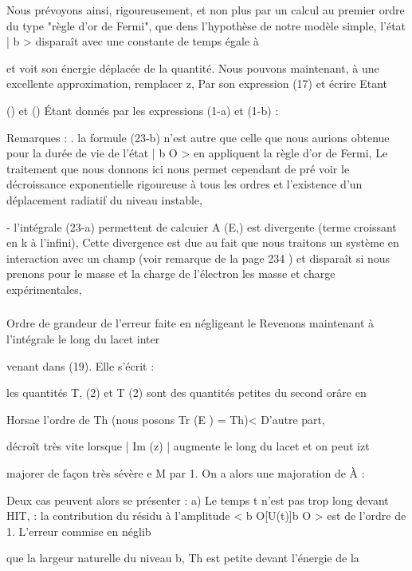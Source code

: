 Nous prévoyons ainsi, rigoureusement, et non plus par un calcul
au premier ordre du type "règle d'or de Fermi", que dens l'hypothèse de notre
modèle simple, l'état | b  > disparaît avec une constante de temps égale à

 et voit son énergie déplacée de la quantité.
Nous pouvons maintenant, à une excellente approximation, remplacer
z, Par son expression (17) et écrire
Etant


() et () Étant donnés par les expressions (1-a) et (1-b) :

Remarques : . la formule (23-b) n'est autre que celle que nous aurions
obtenue pour la durée de vie de l'état | b O > en appliquent la règle d'or
de Fermi, Le traitement que nous donnons ici nous permet cependant de pré
voir le décroissance exponentielle rigoureuse à tous les ordres et l'existence d'un déplacement radiatif du niveau instable,

- l'intégrale (23-a) permettent de calcuier A (E,) est divergente (terme croissant en k à l'infini), Cette divergence est due au fait
que nous traitons un système en interaction avec un champ (voir remarque de
la page 234 ) et disparaît si nous prenons pour le masse et la charge de
l'électron les masse et charge expérimentales,

\subsubsection{} Ordre de grandeur de l'erreur faite en négligeant le%
Revenons maintenant à l'intégrale le long du lacet inter

venant dans (19). Elle s'écrit :


les quantités T, (2) et T (2) sont des quantités petites du second orâre en

Horsae l'ordre de Th (nous posons Tr (E ) = Th)< D'autre part,

décroît très vite lorsque | Im (z) | augmente le long du lacet et on peut
izt

majorer de façon très sévère e M par 1. On a alors une majoration de À :

Deux cas peuvent alors se présenter :
a) Le temps t n'est pas trop long devant HIT, : la contribution du résidu à
l'amplitude < b O[U(t)]b O > est de l'ordre de 1. L'erreur commise en néglib

que la largeur naturelle du niveau b, Th est petite devant l'énergie de la

